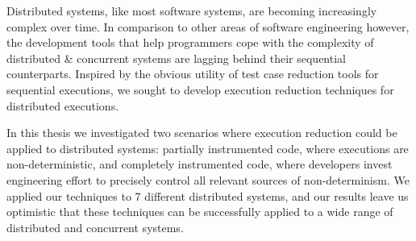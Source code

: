 Distributed systems, like most software systems, are becoming increasingly complex over time.
In comparison to other areas of software engineering however, the development
tools that help programmers cope with the complexity of distributed \&
concurrent systems are lagging behind their sequential counterparts.
Inspired by the obvious utility of test case reduction tools for sequential
executions, we sought to develop
execution reduction techniques for distributed executions.

In this thesis we investigated two scenarios where execution reduction could be applied to
distributed systems: partially instrumented code, where executions are non-deterministic, and
completely instrumented code, where developers invest engineering effort
to precisely control all relevant sources of non-determinism. We applied our
techniques to 7 different distributed systems, and our results
leave us optimistic that these techniques can be
successfully applied to a wide range of distributed and concurrent systems.

%
%
%

